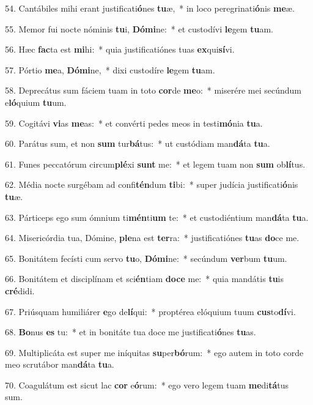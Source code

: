 54. Cantábiles mihi erant justificati\textbf{ó}nes \textbf{tu}æ,~*  in loco peregrinati\textbf{ó}nis \textbf{me}æ.\

55. Memor fui nocte nóminis \textbf{tu}i, \textbf{Dó}\textbf{mi}ne:~*  et custodívi \textbf{le}gem \textbf{tu}am.\

56. Hæc \textbf{fac}ta est \textbf{mi}hi:~*  quia justificatiónes tuas \textbf{ex}qui\textbf{sí}vi.\

57. Pórtio \textbf{me}a, \textbf{Dó}\textbf{mi}ne,~*  dixi custodíre \textbf{le}gem \textbf{tu}am.\

58. Deprecátus sum fáciem tuam in toto \textbf{cor}de \textbf{me}o:~*  miserére mei secúndum e\textbf{ló}quium \textbf{tu}um.\

59. Cogitávi \textbf{vi}as \textbf{me}as:~*  et convérti pedes meos in testi\textbf{mó}nia \textbf{tu}a.\

60. Parátus sum, et non \textbf{sum} tur\textbf{bá}tus:~*  ut custódiam man\textbf{dá}ta \textbf{tu}a.\

61. Funes peccatórum circum\textbf{plé}xi \textbf{sunt} me:~*  et legem tuam non \textbf{sum} ob\textbf{lí}tus.\

62. Média nocte surgébam ad confi\textbf{tén}dum \textbf{ti}bi:~*  super judícia justificati\textbf{ó}nis \textbf{tu}æ.\

63. Párticeps ego sum ómnium ti\textbf{mén}ti\textbf{um} te:~*  et custodiéntium man\textbf{dá}ta \textbf{tu}a.\

64. Misericórdia tua, Dómine, \textbf{ple}na est \textbf{ter}ra:~*  justificatiónes \textbf{tu}as \textbf{do}ce me.\

65. Bonitátem fecísti cum servo \textbf{tu}o, \textbf{Dó}\textbf{mi}ne:~*  secúndum \textbf{ver}bum \textbf{tu}um.\

66. Bonitátem et disciplínam et sci\textbf{én}tiam \textbf{do}\textbf{ce} me:~*  quia mandátis \textbf{tu}is \textbf{cré}didi.\

67. Priúsquam humiliárer \textbf{e}go de\textbf{lí}qui:~*  proptérea elóquium tuum \textbf{cus}to\textbf{dí}vi.\

68. \textbf{Bo}nus \textbf{es} tu:~*  et in bonitáte tua doce me justificati\textbf{ó}nes \textbf{tu}as.\

69. Multiplicáta est super me iníquitas \textbf{su}per\textbf{bó}rum:~*  ego autem in toto corde meo scrutábor man\textbf{dá}ta \textbf{tu}a.\

70. Coagulátum est sicut lac \textbf{cor} e\textbf{ó}rum:~*  ego vero legem tuam \textbf{me}di\textbf{tá}tus sum.\

